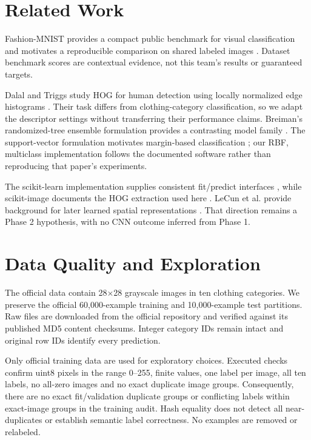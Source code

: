 \documentclass[conference]{IEEEtran}
\begin{document}
\section{Related Work}
Fashion-MNIST provides a compact public benchmark for visual classification
and motivates a reproducible comparison on shared labeled images
\cite{xiao2017fashion}. Dataset benchmark scores are contextual evidence,
not this team's results or guaranteed targets.

Dalal and Triggs study HOG for human detection using locally normalized edge
histograms \cite{dalal2005hog}. Their task differs from clothing-category
classification, so we adapt the descriptor settings without transferring
their performance claims. Breiman's randomized-tree ensemble formulation
provides a contrasting model family \cite{breiman2001forests}. The
support-vector formulation motivates margin-based classification
\cite{cortes1995support}; our RBF, multiclass implementation follows the
documented software rather than reproducing that paper's experiments.

The scikit-learn implementation supplies consistent fit/predict interfaces
\cite{pedregosa2011sklearn}, while scikit-image documents the HOG extraction
used here \cite{skimagehog}. LeCun et al. provide background for later learned
spatial representations \cite{lecun1998gradient}. That direction remains a
Phase 2 hypothesis, with no CNN outcome inferred from Phase 1.

\section{Data Quality and Exploration}
The official data contain 28$\times$28 grayscale images in ten clothing
categories. We preserve the official 60,000-example training and 10,000-example
test partitions. Raw files are downloaded from the official repository and
verified against its published MD5 content checksums. Integer category IDs
remain intact and original row IDs identify every prediction.

Only official training data are used for exploratory choices. Executed checks
confirm uint8 pixels in the range 0--255, finite values, one label per image,
all ten labels, no all-zero images and no exact duplicate image groups.
Consequently, there are no exact fit/validation duplicate groups or conflicting
labels within exact-image groups in the training audit. Hash equality does not
detect all near-duplicates or establish semantic label correctness. No examples
are removed or relabeled.
\end{document}
